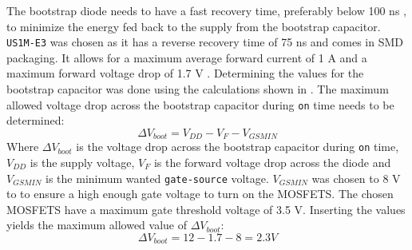 The bootstrap diode needs to have a fast recovery time, preferably below 100 ns \cite{bootstrap_infineon}, to minimize the energy fed back to the supply from the bootstrap capacitor.
\texttt{US1M-E3} was chosen as it has a reverse recovery time of 75 ns and comes in SMD packaging. 
It allows for a maximum average forward current of 1 A and a maximum forward voltage drop of 1.7 V \cite{diode_ds}.
Determining the values for the bootstrap capacitor was done using the calculations shown in \cite{bootstrap_ON}.
The maximum allowed voltage drop across the bootstrap capacitor during \texttt{on} time needs to be determined: 
\begin{equation}
\Delta V_{boot} = V_{DD} - V_{F} - V_{GSMIN}
\end{equation}
Where $\Delta V_{boot}$ is the voltage drop across the bootstrap capacitor during \texttt{on} time, $V_{DD}$ is the supply voltage, $V_F$ is the forward voltage drop across the diode and $V_{GSMIN}$ is the minimum wanted \texttt{gate-source} voltage.
$V_{GSMIN}$ was chosen to 8 V to to ensure a high enough gate voltage to turn on the MOSFETS. 
The chosen MOSFETS have a maximum gate threshold voltage of 3.5 V. 
Inserting the values yields the maximum allowed value of $\Delta V_{boot}$:
\begin{equation}
\Delta V_{boot} = 12 - 1.7 - 8 = 2.3 V	
\end{equation}

